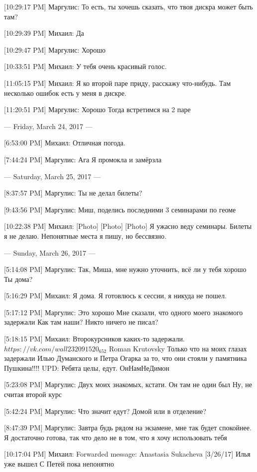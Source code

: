 \documentclass{article}
\begin{document}
[10:29:17 PM] Маргулис:
То есть, ты хочешь сказать, что твоя дискра может быть там?

[10:29:39 PM] Михаил:
Да

[10:29:47 PM] Маргулис:
Хорошо

[10:33:51 PM] Михаил:
У тебя очень красивый голос.

[11:05:15 PM] Михаил:
Я ко второй паре приду, расскажу что-нибудь. Там несколько ошибок есть у меня в дискре.

[11:20:51 PM] Маргулис:
Хорошо
 Тогда встретимся на 2 паре

--- Friday, March 24, 2017 ---

[6:53:00 PM] Михаил:
Отличная погода.

[7:44:24 PM] Маргулис:
Ага
 Я промокла и замёрзла

--- Saturday, March 25, 2017 ---

[8:37:57 PM] Маргулис:
Ты не делал билеты?

[9:43:56 PM] Маргулис:
Миш, поделись последними 3 семинарами по геоме

[10:22:38 PM] Михаил:
[Photo]
 [Photo]
 [Photo]
 Я ужасно веду семинары.
 Билеты я не делаю. Непонятные места я пишу, но бессвязно.

--- Sunday, March 26, 2017 ---

[5:14:08 PM] Маргулис:
Так, Миша, мне нужно уточнить, всё ли у тебя хорошо
 Ты дома?

[5:16:29 PM] Михаил:
Я дома.
 Я готовлюсь к сессии, я никуда не пошел.

[5:17:12 PM] Маргулис:
Это хорошо
 Мне сказали, что одного моего знакомого задержали
 Как там наши? Никто ничего не писал?

[5:18:15 PM] Михаил:
Второкурсников каких-то задержали.
$ https://vk.com/wall232091520_652$
Roman Krutovsky
Только что на моих глазах задержали Илью Думанского и Петра Огарка за то, что они стояли у памятника Пушкина!!!! UPD: Ребята целы, едут. ОнНамНеДимон


[5:23:08 PM] Маргулис:
Двух моих знакомых, кстати. Он там не один был
 Ну, не считая второй курс

[5:42:24 PM] Маргулис:
Что значит едут?
 Домой или в отделение?

[8:47:39 PM] Маргулис:
Завтра будь рядом на экзамене, мне так будет спокойнее. Я достаточно готова, так что дело не в том, что я хочу использовать тебя

[10:17:04 PM] Михаил:
Forwarded message: Anastasia Sukacheva [3/26/17] 
Илья уже вышел
С Петей пока непонятно
\end{document}
